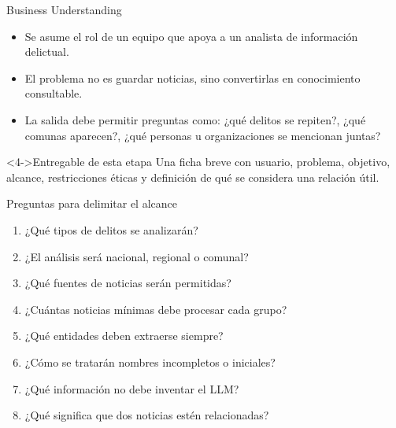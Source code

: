 \documentclass[11pt,aspectratio=169]{beamer}
\begin{document}
\begin{frame}{Business Understanding}
\small
\begin{itemize}[<+->]
\item Se asume el rol de un equipo que apoya a un analista de información delictual.
\item El problema no es guardar noticias, sino convertirlas en conocimiento consultable.
\item La salida debe permitir preguntas como: ¿qué delitos se repiten?, ¿qué comunas aparecen?, ¿qué personas u organizaciones se mencionan juntas?
\end{itemize}

\begin{alertblock}<4->{Entregable de esta etapa}
Una ficha breve con usuario, problema, objetivo, alcance, restricciones éticas y definición de qué se considera una relación útil.
\end{alertblock}
\end{frame}

\begin{frame}{Preguntas para delimitar el alcance}
\scriptsize
\begin{enumerate}[<+->]
\item ¿Qué tipos de delitos se analizarán?
\item ¿El análisis será nacional, regional o comunal?
\item ¿Qué fuentes de noticias serán permitidas?
\item ¿Cuántas noticias mínimas debe procesar cada grupo?
\item ¿Qué entidades deben extraerse siempre?
\item ¿Cómo se tratarán nombres incompletos o iniciales?
\item ¿Qué información no debe inventar el LLM?
\item ¿Qué significa que dos noticias estén relacionadas?
\end{enumerate}
\end{frame}
\end{document}
